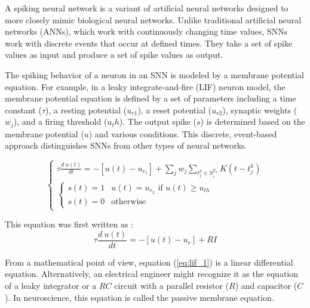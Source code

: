 \documentclass[11pt]{article}
\begin{document}
A spiking neural network is a variant of artificial neural networks designed to more closely mimic biological neural networks. Unlike traditional artificial neural networks (ANNs), which work with continuously changing time values, SNNs work with discrete events that occur at defined times. They take a set of spike values as input and produce a set of spike values as output.

The spiking behavior of a neuron in an SNN is modeled by a membrane potential equation. For example, in a leaky integrate-and-fire (LIF) neuron model, the membrane potential equation is defined by a set of parameters including a time constant ($\tau$), a resting potential ($u_{r1}$), a reset potential ($u_{r2}$), synaptic weights ($w_j$), and a firing threshold ($u_th$). The output spike ($s$) is determined based on the membrane potential ($u$) and various conditions. This discrete, event-based approach distinguishes SNNs from other types of neural networks.\cite{rething_comparison_ann_snn}

\begin{equation}
  \begin{cases}
    \tau \frac{d \: u(t)}{dt} = - [u(t) - u_{r_1}] + \sum_j w_j \sum_{t_j^k \in  S_i^{T_w}} K(t - t_j^k) \\
    \begin{cases}
      s(t) = 1 & u(t) = u_{r_2} \text{ if } u(t) \geq u_{th} \\
      s(t) = 0 & \text{otherwise}
    \end{cases}
  \end{cases}
  \label{eq:membrane_potential}
\end{equation}

This equation was first written as :
\begin{equation}
  \tau \frac{d \: u(t)}{dt} = - [u(t) - u_{r}] + RI
  \label{eq:lif_1}
\end{equation}

From a mathematical point of view, equation (\ref{eq:lif_1}) is a linear differential equation. Alternatively, an electrical engineer might recognize it as the equation of a leaky integrator or a $RC$ circuit with a parallel resistor ($R$) and capacitor ($C$). In neuroscience, this equation is called the passive membrane equation. \cite{neuronal_dynamics}
\end{document}
